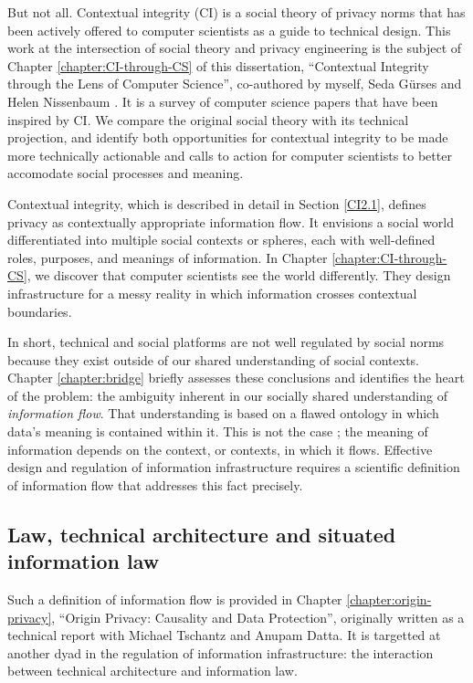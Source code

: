 \documentclass[../thesis.tex]{subfiles}
\begin{document}
 But not all.
 Contextual integrity (CI) is a social theory of privacy norms
 that has been actively offered to computer scientists
 as a guide to technical design.
 This work at the intersection of social theory and
 privacy engineering is the subject of 
 Chapter \ref{chapter:CI-through-CS} of this
 dissertation, ``Contextual Integrity through the Lens of Computer Science'', co-authored by myself, Seda G{\"u}rses and
 Helen Nissenbaum \cite{benthall2017contextual}.
 It is a survey of computer science papers that have been
 inspired by CI.
 We compare the original social theory with its technical projection, and identify both opportunities for contextual integrity to be made more technically actionable and calls to action for computer scientists to better accomodate social processes and meaning.

 Contextual integrity, which is described in detail in
 Section \ref{CI2.1}, defines privacy as contextually
 appropriate information flow.
 It envisions a social world differentiated into multiple
 social contexts or spheres, each with well-defined
 roles, purposes, and meanings of information.
 In Chapter \ref{chapter:CI-through-CS}, we discover that
 computer scientists see the world differently.
 They design infrastructure for a messy reality in which
 information crosses contextual boundaries.

 In short, technical and social platforms are not well
 regulated by social norms because they exist outside
 of our shared understanding of social contexts.
 Chapter \ref{chapter:bridge} briefly assesses these conclusions
 and identifies the  heart of the problem:
 the ambiguity inherent in our socially shared
 understanding of \textit{information flow}.
 That understanding is based on a flawed ontology
 in which data's meaning is contained within it.
 This is not the case \cite{horvitz2015data};
 the meaning of information depends on the context,
 or contexts, in which it flows.
 Effective design and regulation of information
 infrastructure requires a scientific
 definition of information flow that addresses this
 fact precisely.
 
 \subsection{Law, technical architecture and situated information law}

 Such a definition of information flow is provided in
 Chapter \ref{chapter:origin-privacy},
 ``Origin Privacy: Causality and Data Protection'', originally
 written as a technical report
 with Michael Tschantz and Anupam Datta. 
 It is targetted at another dyad in the regulation of information
 infrastructure: the interaction between technical architecture
 and information law.
\end{document}
